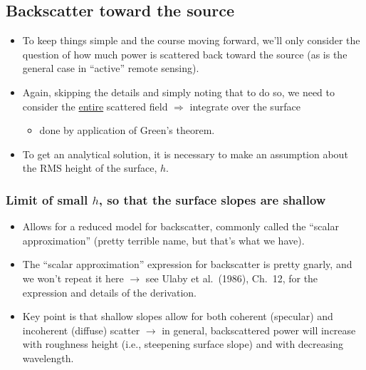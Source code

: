 \documentclass[11pt, oneside]{article}
\begin{document}
\subsection{Backscatter toward the source}

\begin{itemize}
	\item To keep things simple and the course moving forward, we'll only consider the question of how much power is scattered back toward the source (as is the general case in ``active'' remote sensing).
	\item Again, skipping the details and simply noting that to do so, we need to consider the \underline{entire} scattered field $\Rightarrow$ integrate over the surface
	\begin{itemize}
		\item[$\rightarrow$] done by application of Green's theorem.
	\end{itemize}
	\item To get an analytical solution, it is necessary to make an assumption about the RMS height of the surface, $h$.
\end{itemize}

\subsubsection{Limit of small $h$, so that the surface slopes are shallow}

\begin{itemize}
	\item Allows for a reduced model for backscatter, commonly called the ``scalar approximation'' (pretty terrible name, but that's what we have).
	\item The ``scalar approximation'' expression for backscatter is pretty gnarly, and we won't repeat it here $\rightarrow$ see Ulaby et al.\ (1986), Ch.~12, for the expression and details of the derivation.
	\item Key point is that shallow slopes allow for both coherent (specular) and incoherent (diffuse) scatter $\rightarrow$ in general, backscattered power will increase with roughness height (i.e., steepening surface slope) and with decreasing wavelength.
\end{itemize}
\end{document}
